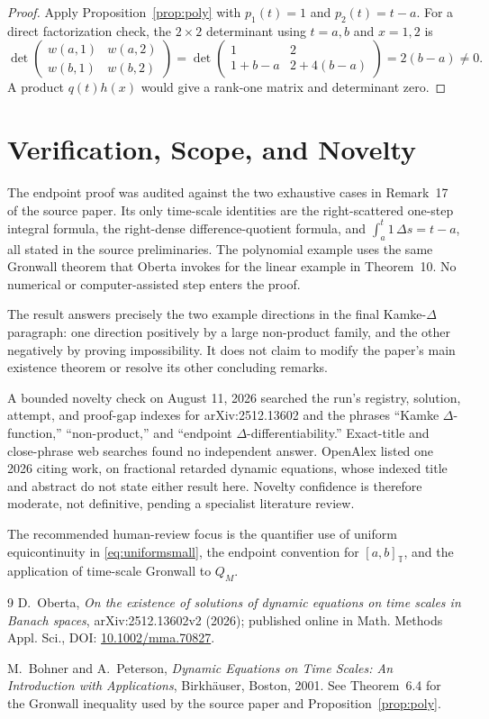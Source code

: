 \documentclass[11pt]{article}
\newcommand{\T}{\mathbb T}
\newcommand{\Deltas}{\,\Delta s}
\begin{document}
\begin{proof}
Apply Proposition~\ref{prop:poly} with $p_1(t)=1$ and $p_2(t)=t-a$.
For a direct factorization check, the $2\times2$ determinant using
$t=a,b$ and $x=1,2$ is
\[
 \det\begin{pmatrix}w(a,1)&w(a,2)\\w(b,1)&w(b,2)\end{pmatrix}
 =\det\begin{pmatrix}1&2\\1+b-a&2+4(b-a)\end{pmatrix}
 =2(b-a)\neq0.
\]
A product $q(t)h(x)$ would give a rank-one matrix and determinant zero.
\end{proof}

\section*{Verification, Scope, and Novelty}

The endpoint proof was audited against the two exhaustive cases in Remark~17
of the source paper.  Its only time-scale identities are the right-scattered
one-step integral formula, the right-dense difference-quotient formula, and
$\int_a^t1\Deltas=t-a$, all stated in the source preliminaries.  The
polynomial example uses the same Gronwall theorem that Oberta invokes for the
linear example in Theorem~10.  No numerical or computer-assisted step enters
the proof.

The result answers precisely the two example directions in the final
Kamke-$\Delta$ paragraph: one direction positively by a large non-product
family, and the other negatively by proving impossibility.  It does not claim
to modify the paper's main existence theorem or resolve its other concluding
remarks.

A bounded novelty check on August 11, 2026 searched the run's registry,
solution, attempt, and proof-gap indexes for arXiv:2512.13602 and the phrases
``Kamke $\Delta$-function,'' ``non-product,'' and ``endpoint
$\Delta$-differentiability.''  Exact-title and close-phrase web searches found
no independent answer.  OpenAlex listed one 2026 citing work, on fractional
retarded dynamic equations, whose indexed title and abstract do not state
either result here.  Novelty confidence is therefore moderate, not
definitive, pending a specialist literature review.

The recommended human-review focus is the quantifier use of uniform
equicontinuity in \eqref{eq:uniformsmall}, the endpoint convention for
$[a,b]_{\T}$, and the application of time-scale Gronwall to $Q_M$.

\begin{thebibliography}{9}
D.~Oberta,
\emph{On the existence of solutions of dynamic equations on time scales in
Banach spaces}, arXiv:2512.13602v2 (2026); published online in
Math. Methods Appl. Sci., DOI: \href{https://doi.org/10.1002/mma.70827}{10.1002/mma.70827}.

M.~Bohner and A.~Peterson,
\emph{Dynamic Equations on Time Scales: An Introduction with Applications},
Birkh\"auser, Boston, 2001.  See Theorem~6.4 for the Gronwall inequality
used by the source paper and Proposition~\ref{prop:poly}.
\end{thebibliography}
\end{document}
